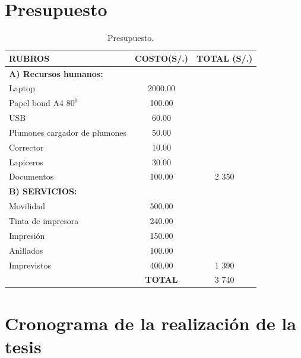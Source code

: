 \section{Presupuesto}


\begin{table}[htb]
\centering
\begin{tabular}{|p{7cm}|c|c|}
\hline
\textbf{RUBROS} & \textbf{COSTO(S/.)}& \textbf{TOTAL (S/.)} \\ \hline
\textbf{A) Recursos humanos:} & & \\
Laptop & 2000.00& \\
Papel bond A4 $80^0$ &100.00 & \\
USB &60.00&\\
Plumones cargador de plumones&50.00&\\
Corrector &10.00&\\
Lapiceros &30.00&\\
Documentos &100.00& 2 350\\ \hline
\textbf{B) SERVICIOS:} &&\\
Movilidad &500.00& \\
Tinta de impresora &240.00& \\
Impresión &150.00 &\\
Anillados &100.00&\\
Imprevistos &400.00& 1 390\\ \hline
& \textbf{TOTAL}& 3 740\\
 \hline
\end{tabular}
\caption{Presupuesto.}
\label{tabla:final}
\end{table}



\section{Cronograma de la realización de la tesis}

